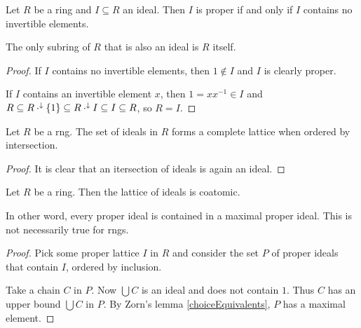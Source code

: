 \begin{lemma} \label{properIdealNoUnit}
Let $R$ be a ring and $I\subseteq R$ an ideal. Then $I$ is proper \textup{if and only if} $I$ contains no invertible elements.
\end{lemma}
The only subring of $R$ that is also an ideal is $R$ itself.
\begin{proof}
If $I$ contains no invertible elements, then $1\notin I$ and $I$ is clearly proper.

If $I$ contains an invertible element $x$, then $1 = xx^{-1}\in I$ and $R \subseteq R\cdot^\downarrow\{1\} \subseteq R\cdot^\downarrow I \subseteq I \subseteq R$, so $R = I$.
\end{proof}

\begin{lemma}
Let $R$ be a rng. The set of ideals in $R$ forms a complete lattice when ordered by intersection.
\end{lemma}
\begin{proof}
It is clear that an itersection of ideals is again an ideal.
\end{proof}

\begin{proposition}  \label{idealLatticeCoatomic}
Let $R$ be a ring. Then the lattice of ideals is coatomic.
\end{proposition}
In other word, every proper ideal is contained in a maximal proper ideal. This is not necessarily true for rngs.
\begin{proof}
Pick some proper lattice $I$ in $R$ and consider the set $P$ of proper ideals that contain $I$, ordered by inclusion.

Take a chain $C$ in $P$. Now $\bigcup C$ is an ideal and does not contain $1$. Thus $C$ has an upper bound $\bigcup C$ in $P$. By Zorn's lemma \ref{choiceEquivalents}, $P$ has a maximal element.
\end{proof}


